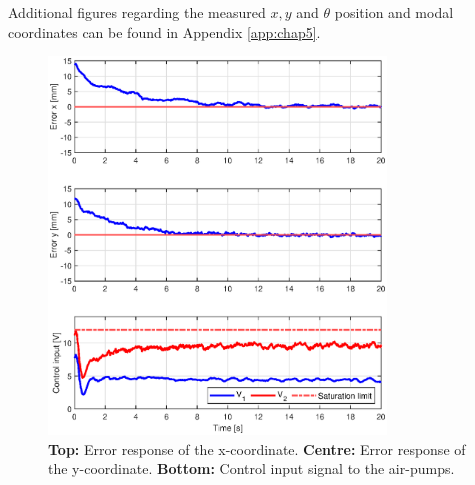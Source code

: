 Additional figures regarding the measured $x,y$ and $\theta$ position and modal coordinates can be found in Appendix \ref{app:chap5}.




\newpage
\begin{figure}[H]
    \centering
    \includegraphics[width = 0.8\textwidth]{Figures/Chapter5/errorsignalright.eps}
    \caption{\textbf{Top:} Error response of the x-coordinate. \textbf{Centre:} Error response of the y-coordinate. \textbf{Bottom:} Control input signal to the air-pumps.}
    \label{fig5:stepright}
\end{figure}

